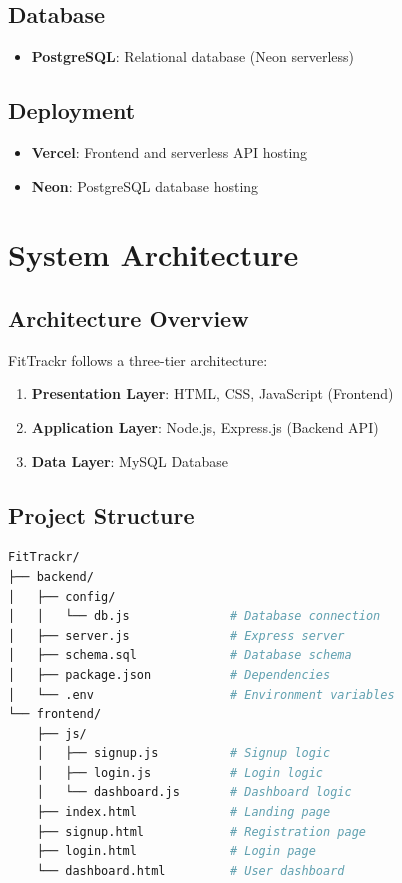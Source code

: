 \documentclass[12pt,a4paper]{article}
\begin{document}
\subsection{Database}
\begin{itemize}
    \item \textbf{PostgreSQL}: Relational database (Neon serverless)
\end{itemize}

\subsection{Deployment}
\begin{itemize}
    \item \textbf{Vercel}: Frontend and serverless API hosting
    \item \textbf{Neon}: PostgreSQL database hosting
\end{itemize}

\section{System Architecture}

\subsection{Architecture Overview}
FitTrackr follows a three-tier architecture:
\begin{enumerate}
    \item \textbf{Presentation Layer}: HTML, CSS, JavaScript (Frontend)
    \item \textbf{Application Layer}: Node.js, Express.js (Backend API)
    \item \textbf{Data Layer}: MySQL Database
\end{enumerate}

\subsection{Project Structure}
\begin{lstlisting}[language=bash]
FitTrackr/
├── backend/
│   ├── config/
│   │   └── db.js              # Database connection
│   ├── server.js              # Express server
│   ├── schema.sql             # Database schema
│   ├── package.json           # Dependencies
│   └── .env                   # Environment variables
└── frontend/
    ├── js/
    │   ├── signup.js          # Signup logic
    │   ├── login.js           # Login logic
    │   └── dashboard.js       # Dashboard logic
    ├── index.html             # Landing page
    ├── signup.html            # Registration page
    ├── login.html             # Login page
    └── dashboard.html         # User dashboard
\end{lstlisting}
\end{document}
